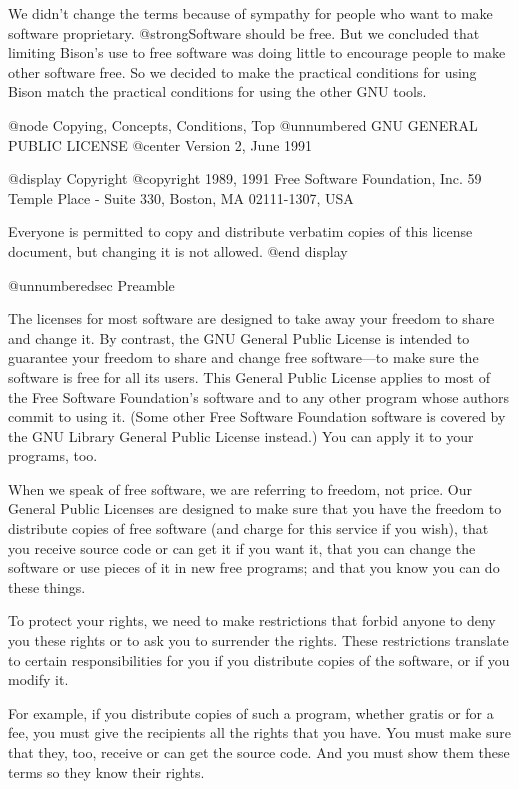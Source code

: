 We didn't change the terms because of sympathy for people who want to
make software proprietary.  @strong{Software should be free.}  But we
concluded that limiting Bison's use to free software was doing little to
encourage people to make other software free.  So we decided to make the
practical conditions for using Bison match the practical conditions for
using the other GNU tools.

@node Copying, Concepts, Conditions, Top
@unnumbered GNU GENERAL PUBLIC LICENSE
@center Version 2, June 1991

@display
Copyright @copyright{} 1989, 1991 Free Software Foundation, Inc.
59 Temple Place - Suite 330, Boston, MA 02111-1307, USA

Everyone is permitted to copy and distribute verbatim copies
of this license document, but changing it is not allowed.
@end display

@unnumberedsec Preamble

  The licenses for most software are designed to take away your
freedom to share and change it.  By contrast, the GNU General Public
License is intended to guarantee your freedom to share and change free
software---to make sure the software is free for all its users.  This
General Public License applies to most of the Free Software
Foundation's software and to any other program whose authors commit to
using it.  (Some other Free Software Foundation software is covered by
the GNU Library General Public License instead.)  You can apply it to
your programs, too.

  When we speak of free software, we are referring to freedom, not
price.  Our General Public Licenses are designed to make sure that you
have the freedom to distribute copies of free software (and charge for
this service if you wish), that you receive source code or can get it
if you want it, that you can change the software or use pieces of it
in new free programs; and that you know you can do these things.

  To protect your rights, we need to make restrictions that forbid
anyone to deny you these rights or to ask you to surrender the rights.
These restrictions translate to certain responsibilities for you if you
distribute copies of the software, or if you modify it.

  For example, if you distribute copies of such a program, whether
gratis or for a fee, you must give the recipients all the rights that
you have.  You must make sure that they, too, receive or can get the
source code.  And you must show them these terms so they know their
rights.


